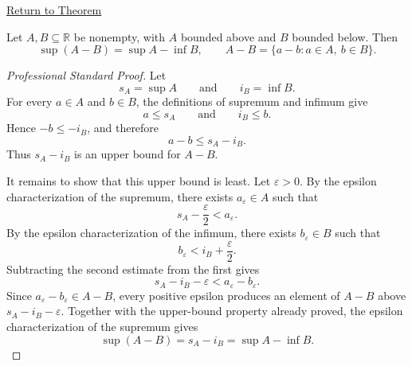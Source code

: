 \newpage
{}
\label{prf:supremum-difference-set}

\begin{remark*}[Return]
\hyperref[thm:supremum-difference-set]{Return to Theorem}
\end{remark*}

\begin{theorem*}
Let $A,B\subseteq\mathbb{R}$ be nonempty, with $A$ bounded above and $B$ bounded below. Then
\[
  \sup(A-B)=\sup A-\inf B,
  \qquad
  A-B=\{a-b:a\in A,\ b\in B\}.
\]
\end{theorem*}

\begin{proof}[Professional Standard Proof]
\LRAProofBodyStart
Let
\[
  s_A=\sup A
  \qquad\text{and}\qquad
  i_B=\inf B.
\]
For every $a\in A$ and $b\in B$, the definitions of supremum and infimum give
\[
  a\le s_A
  \qquad\text{and}\qquad
  i_B\le b.
\]
Hence $-b\le -i_B$, and therefore
\[
  a-b\le s_A-i_B.
\]
Thus $s_A-i_B$ is an upper bound for $A-B$.

It remains to show that this upper bound is least. Let $\varepsilon>0$. By the
epsilon characterization of the supremum, there exists $a_\varepsilon\in A$
such that
\[
  s_A-\frac{\varepsilon}{2}<a_\varepsilon.
\]
By the epsilon characterization of the infimum, there exists
$b_\varepsilon\in B$ such that
\[
  b_\varepsilon<i_B+\frac{\varepsilon}{2}.
\]
Subtracting the second estimate from the first gives
\[
  s_A-i_B-\varepsilon
  <
  a_\varepsilon-b_\varepsilon.
\]
Since $a_\varepsilon-b_\varepsilon\in A-B$, every positive epsilon produces an
element of $A-B$ above $s_A-i_B-\varepsilon$. Together with the upper-bound
property already proved, the epsilon characterization of the supremum gives
\[
  \sup(A-B)=s_A-i_B=\sup A-\inf B.
\]
\end{proof}

